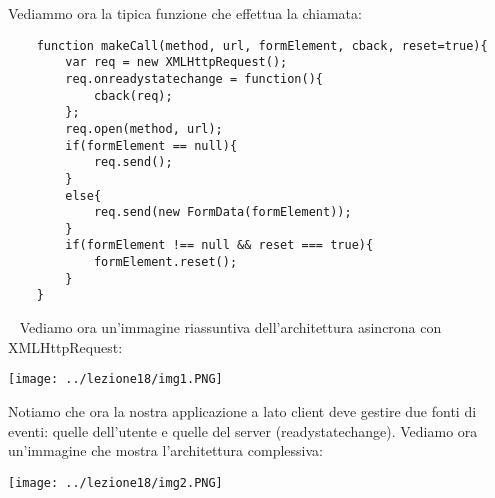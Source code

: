 Vediammo ora la tipica funzione che effettua la chiamata:
\begin{lstlisting}
    function makeCall(method, url, formElement, cback, reset=true){
        var req = new XMLHttpRequest();
        req.onreadystatechange = function(){
            cback(req);
        };
        req.open(method, url);
        if(formElement == null){
            req.send();
        }
        else{
            req.send(new FormData(formElement));
        }
        if(formElement !== null && reset === true){
            formElement.reset();
        }
    }
\end{lstlisting}
\ \newline
Vediamo ora un'immagine riassuntiva dell'architettura asincrona con XMLHttpRequest:
\begin{center}
    \texttt{[image: ../lezione18/img1.PNG]}
\end{center}
Notiamo che ora la nostra applicazione a lato client deve gestire due fonti di eventi: quelle dell'utente e quelle del server (readystatechange).\newline
Vediamo ora un'immagine che mostra l'architettura complessiva:
\begin{center}
    \texttt{[image: ../lezione18/img2.PNG]}
\end{center}